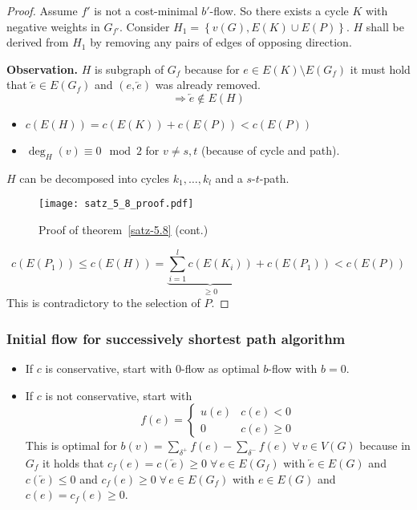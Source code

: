 \documentclass{article}
\newcommand{\set}[1]{\left\{#1\right\}}
\newcommand{\gath}[2]{$#1$-$#2$-path} %
\newcommand{\fall}{\;\forall\,}
\begin{document}
\begin{proof}
  Assume $f'$ is not a cost-minimal $b'$-flow. So there exists a cycle $K$ with negative weights in $G_{f'}$.
  Consider $H_1 = \set{v(G), E(K) \cup E(P)}$. $H$ shall be derived from $H_1$ by removing any pairs of edges of opposing direction.

  \textbf{Observation.} $H$ is subgraph of $G_f$ because for $e \in E(K) \setminus E(G_f)$ it must hold that $\overleftarrow{e} \in E(G_f)$ and $(e, \overleftarrow{e})$ was already removed.
  \[ \Rightarrow \overleftarrow{e} \notin E(H) \]

  \begin{itemize}
    \item $c(E(H)) = c(E(K)) + c(E(P)) < c(E(P))$
    \item $\deg_H(v) \equiv 0 \mod{2}$ for $v \neq s, t$ (because of cycle and path).
  \end{itemize}

  $H$ can be decomposed into cycles $k_1, \ldots, k_l$ and a \gath st.

  \begin{figure}[h]
   \begin{center}
    \texttt{[image: satz\_5\_8\_proof.pdf]}
    \caption{Proof of theorem~\ref{satz-5.8} (cont.)}
   \end{center}
  \end{figure}

  \[ c(E(P_1)) \leq c(E(H)) = \underbrace{\sum_{i=1}^l c(E(K_i))}_{\geq 0} + c(E(P_1)) < c(E(P)) \]
  This is contradictory to the selection of $P$.
\end{proof}

\subsubsection{Initial flow for successively shortest path algorithm}
\begin{itemize}
  \item If $c$ is conservative, start with $0$-flow as optimal $b$-flow with $b=0$.
  \item If $c$ is not conservative, start with \[
      f(e) = \left\{\begin{array}{cc}
        u(e) & c(e) < 0 \\
        0    & c(e) \geq 0
      \end{array}\right.
    \]
    This is optimal for $b(v) = \sum_{\delta^+} f(e) - \sum_{\delta^-} f(e) \fall v \in V(G)$ because in $G_f$ it holds that $c_f(e) = c(\overleftarrow{e}) \geq 0 \fall e \in E(G_f)$ with $\overleftarrow{e} \in E(G)$ and $c(\overleftarrow{e}) \leq 0$ and $c_f(e) \geq 0 \fall e \in E(G_f)$ with $e \in E(G)$ and $c(e) = c_f(e) \geq 0$.
\end{itemize}
\end{document}

